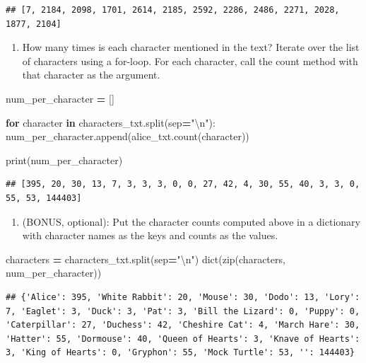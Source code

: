 \documentclass[]{book}
\newenvironment{Shaded}{\begin{snugshade}}{\end{snugshade}}
\newcommand{\BuiltInTok}[1]{#1}
\newcommand{\CharTok}[1]{\textcolor[rgb]{0.31,0.60,0.02}{#1}}
\newcommand{\ControlFlowTok}[1]{\textcolor[rgb]{0.13,0.29,0.53}{\textbf{#1}}}
\newcommand{\KeywordTok}[1]{\textcolor[rgb]{0.13,0.29,0.53}{\textbf{#1}}}
\newcommand{\NormalTok}[1]{#1}
\newcommand{\OperatorTok}[1]{\textcolor[rgb]{0.81,0.36,0.00}{\textbf{#1}}}
\newcommand{\StringTok}[1]{\textcolor[rgb]{0.31,0.60,0.02}{#1}}
\providecommand{\tightlist}{%
  \setlength{\itemsep}{0pt}\setlength{\parskip}{0pt}}
\begin{document}
\begin{verbatim}
## [7, 2184, 2098, 1701, 2614, 2185, 2592, 2286, 2486, 2271, 2028, 1877, 2104]
\end{verbatim}

\begin{enumerate}
\def\labelenumi{\arabic{enumi}.}
\setcounter{enumi}{2}
\tightlist
\item
  How many times is each character mentioned in the text?
  Iterate over the list of characters using a for-loop.
  For each character, call the count method with that character as the argument.
\end{enumerate}

\begin{Shaded}
\begin{Highlighting}[]
\NormalTok{num_per_character }\OperatorTok{=}\NormalTok{ []}

\ControlFlowTok{for}\NormalTok{ character }\KeywordTok{in}\NormalTok{ characters_txt.split(sep}\OperatorTok{=}\StringTok{"}\CharTok{\textbackslash{}n}\StringTok{"}\NormalTok{):}
\NormalTok{    num_per_character.append(alice_txt.count(character))}

\BuiltInTok{print}\NormalTok{(num_per_character)}
\end{Highlighting}
\end{Shaded}

\begin{verbatim}
## [395, 20, 30, 13, 7, 3, 3, 3, 0, 0, 27, 42, 4, 30, 55, 40, 3, 3, 0, 55, 53, 144403]
\end{verbatim}

\begin{enumerate}
\def\labelenumi{\arabic{enumi}.}
\setcounter{enumi}{3}
\tightlist
\item
  (BONUS, optional): Put the character counts computed above in a
  dictionary with character names as the keys and counts as the values.
\end{enumerate}

\begin{Shaded}
\begin{Highlighting}[]
\NormalTok{characters }\OperatorTok{=}\NormalTok{ characters_txt.split(sep}\OperatorTok{=}\StringTok{"}\CharTok{\textbackslash{}n}\StringTok{"}\NormalTok{)}
\BuiltInTok{dict}\NormalTok{(}\BuiltInTok{zip}\NormalTok{(characters, num_per_character))}
\end{Highlighting}
\end{Shaded}

\begin{verbatim}
## {'Alice': 395, 'White Rabbit': 20, 'Mouse': 30, 'Dodo': 13, 'Lory': 7, 'Eaglet': 3, 'Duck': 3, 'Pat': 3, 'Bill the Lizard': 0, 'Puppy': 0, 'Caterpillar': 27, 'Duchess': 42, 'Cheshire Cat': 4, 'March Hare': 30, 'Hatter': 55, 'Dormouse': 40, 'Queen of Hearts': 3, 'Knave of Hearts': 3, 'King of Hearts': 0, 'Gryphon': 55, 'Mock Turtle': 53, '': 144403}
\end{verbatim}
\end{document}
